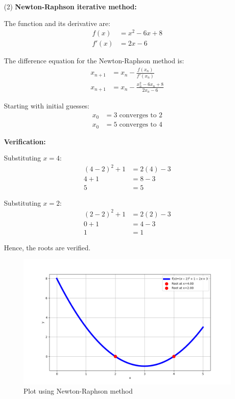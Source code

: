 \documentclass[journal]{IEEEtran}
\begin{document}
(2) \textbf{Newton-Raphson iterative method:}

The function and its derivative are:
\begin{align}
    f(x) &= x^2 - 6x + 8 \\
    f'(x) &= 2x - 6
\end{align}

The difference equation for the Newton-Raphson method is:
\begin{align}
    x_{n+1} &= x_n - \frac{f(x_n)}{f'(x_n)} \\
    x_{n+1} &= x_n - \frac{x_n^2 - 6x_n + 8}{2x_n - 6}
\end{align}

Starting with initial guesses:
\begin{align}
    x_0 &= 3 \text{ converges to } 2 \\
    x_0 &= 5 \text{ converges to } 4
\end{align}

\textbf{Verification:}

Substituting \(x = 4\):
\begin{align}
    (4-2)^2 + 1 &= 2(4) - 3 \\
    4 + 1 &= 8 - 3 \\
    5 &= 5
\end{align}

Substituting \(x = 2\):
\begin{align}
    (2-2)^2 + 1 &= 2(2) - 3 \\
    0 + 1 &= 4 - 3 \\
    1 &= 1
\end{align}

Hence, the roots are verified.

\begin{figure}[h]
\centering
\includegraphics[width=\columnwidth]{figs/fig.png}
\caption{Plot using Newton-Raphson method}
\label{fig:Plot1} 
\end{figure}
\end{document}
